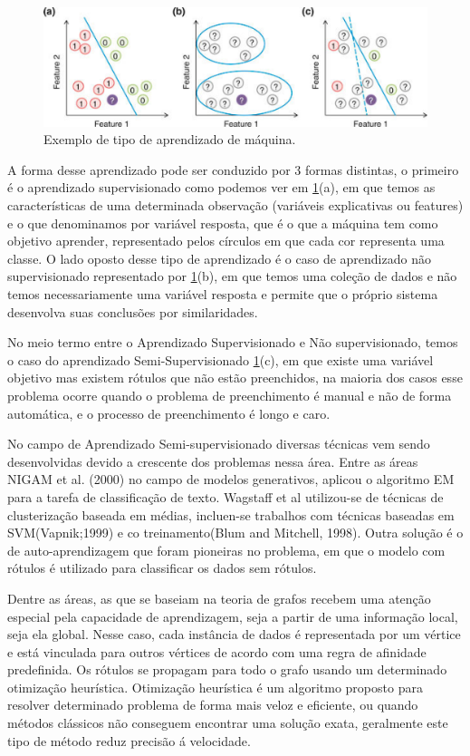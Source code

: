 \documentclass[conference]{IEEEtran}
\begin{document}
 \begin{figure}[htbp]
\centerline{\includegraphics[scale=0.5]{imagem_aprendizado.png}}
\caption{Exemplo de tipo de aprendizado de máquina.}
\label{fig1}
\end{figure}

  A forma desse aprendizado pode ser conduzido por 3 formas distintas\cite{b12}, o primeiro é o aprendizado supervisionado como podemos ver em \ref{fig1}(a), em que temos as características de uma determinada observação (variáveis explicativas ou features) e o que denominamos por variável resposta, que é o que a máquina tem como objetivo aprender, representado pelos círculos em que cada cor representa uma classe. O lado oposto desse tipo de aprendizado é o caso de aprendizado não supervisionado representado por \ref{fig1}(b), em que temos uma coleção de dados e não temos necessariamente uma variável resposta e permite que o próprio sistema desenvolva suas conclusões por similaridades.
  
  No meio termo entre o Aprendizado Supervisionado e Não supervisionado, temos o caso do aprendizado Semi-Supervisionado \ref{fig1}(c), em que existe uma variável objetivo mas existem rótulos que não estão preenchidos, na maioria dos casos esse problema ocorre quando o problema de preenchimento é manual e não de forma automática, e o processo de preenchimento é longo e caro.
  
  No campo de Aprendizado Semi-supervisionado diversas técnicas vem sendo desenvolvidas devido a crescente dos problemas nessa área. Entre as áreas  NIGAM et al. (2000) \cite{b1}  no campo de modelos generativos, aplicou o algoritmo EM para a tarefa de classificação de texto. Wagstaff et al\cite{b14} utilizou-se de técnicas de clusterização baseada em médias, incluen-se trabalhos com técnicas baseadas em SVM(Vapnik;1999\cite{b2}) e co treinamento(Blum and Mitchell, 1998\cite{b3}). Outra solução é o  de auto-aprendizagem que foram pioneiras no problema, em que o modelo com rótulos é utilizado para classificar os dados sem rótulos.
  
  Dentre as áreas, as que se baseiam na teoria de grafos  recebem uma atenção especial pela capacidade de aprendizagem, seja a partir de uma informação local, seja ela global. Nesse caso, cada instância de dados é representada por um vértice e está vinculada para outros vértices de acordo com uma regra de afinidade predefinida. Os rótulos se propagam para todo o grafo usando um determinado otimização heurística. Otimização heurística é um algoritmo proposto para resolver determinado problema de forma mais veloz e eficiente, ou quando métodos clássicos não conseguem encontrar uma solução exata, geralmente este tipo de método reduz %
  precisão á velocidade. 
  
\end{document}
